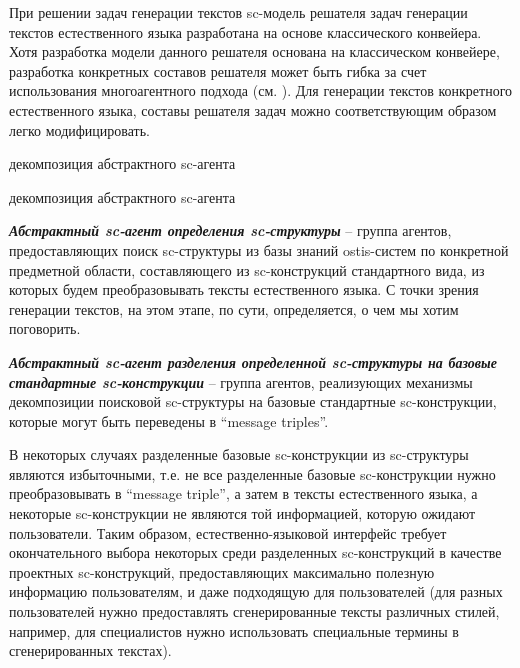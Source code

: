 При решении задач генерации текстов sc-модель решателя задач генерации текстов естественного языка разработана на основе классического конвейера. Хотя разработка модели данного решателя основана на классическом конвейере, разработка конкретных составов решателя может быть гибка за счет использования многоагентного подхода (см. ). Для генерации текстов конкретного естественного языка, составы решателя задач можно соответствующим образом легко модифицировать.
\begin{SCn}
	\begin{scnrelfromset}{декомпозиция абстрактного sc-агента}
	\end{scnrelfromset}
\end{SCn}

\begin{SCn}
	\begin{scnrelfromset}{декомпозиция абстрактного sc-агента}
	\end{scnrelfromset}
\end{SCn}

\textit{\textbf{Абстрактный sc-агент определения sc-структуры}} -- группа агентов, предоставляющих поиск sc-структуры из базы знаний ostis-систем по конкретной предметной области, составляющего из sc-конструкций стандартного вида, из которых будем преобразовывать тексты естественного языка. С точки зрения генерации текстов, на этом этапе, по сути, определяется, о чем мы хотим поговорить. 

\textit{\textbf{Абстрактный sc-агент разделения определенной sc-структуры на базовые стандартные sc-конструкции}} -- группа агентов, реализующих механизмы декомпозиции поисковой sc-структуры на базовые стандартные sc-конструкции, которые могут быть переведены в ``message triples''. 

В некоторых случаях разделенные базовые sc-конструкции из sc-структуры являются избыточными, т.е. не все разделенные базовые sc-конструкции нужно преобразовывать в ``message triple'', а затем в тексты естественного языка, а некоторые sc-конструкции не являются той информацией, которую ожидают пользователи. Таким образом, естественно-языковой интерфейс требует окончательного выбора некоторых среди разделенных sc-конструкций в качестве проектных sc-конструкций, предоставляющих максимально полезную информацию пользователям, и даже подходящую для пользователей (для разных пользователей нужно предоставлять сгенерированные тексты различных стилей, например, для специалистов нужно использовать специальные термины в сгенерированных текстах). 

